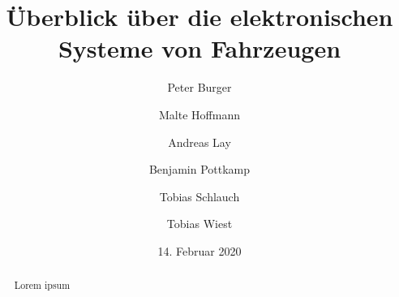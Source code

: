 \documentclass[]{article}
\title{Überblick über die elektronischen Systeme von Fahrzeugen}
\author{
	Peter Burger
	\and
	Malte Hoffmann
	\and
	Andreas Lay
	\and
	Benjamin Pottkamp
	\and
	Tobias Schlauch
	\and
	Tobias Wiest
}
\date{14. Februar 2020}
\begin{document}
\maketitle

\begin{abstract}
Lorem ipsum
\end{abstract}




\end{document}

